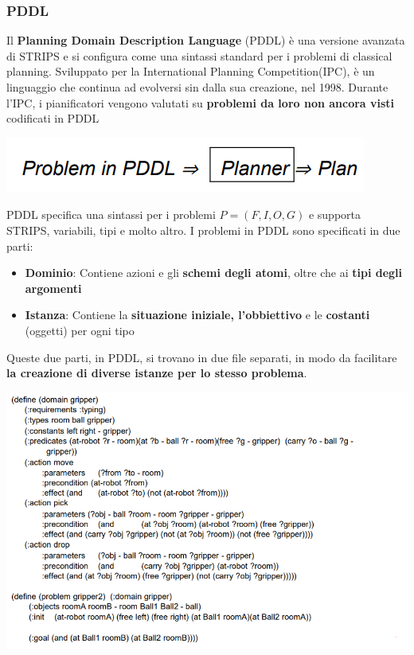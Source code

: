 \documentclass[12pt]{article}
\begin{document}
\subsubsection{PDDL}
Il \textbf{Planning Domain Description Language} (PDDL) è una versione avanzata di STRIPS e si configura come una sintassi standard per i problemi di classical planning.
Sviluppato per la International Planning Competition(IPC), è un linguaggio che continua ad evolversi sin dalla sua creazione, nel 1998.
Durante l'IPC, i pianificatori vengono valutati su \textbf{problemi da loro non ancora visti} codificati in PDDL
\begin{center}
    \includegraphics[width =0.50\linewidth]{Images/56.PNG}
\end{center}
PDDL specifica una sintassi per i problemi $P = (F,I,O,G)$ e supporta STRIPS, variabili, tipi e molto altro.
I problemi in PDDL sono specificati in due parti:
\begin{itemize}
    \item \textbf{Dominio}: Contiene azioni e gli \textbf{schemi degli atomi}, oltre che ai \textbf{tipi degli argomenti}
    \item \textbf{Istanza}: Contiene la \textbf{situazione iniziale, l'obbiettivo} e le \textbf{costanti} (oggetti) per ogni tipo
\end{itemize}
Queste due parti, in PDDL, si trovano in due file separati, in modo da facilitare \textbf{la creazione di diverse istanze per lo stesso problema}.
\begin{center}
    \includegraphics[width =1\linewidth]{Images/57.PNG}
\end{center}
\end{document}
